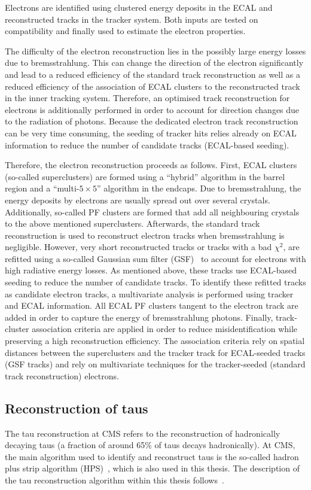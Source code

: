 Electrons are identified using clustered energy deposits in the ECAL and reconstructed tracks in the tracker system. 
Both inputs are tested on compatibility and finally used to estimate the electron properties. 

The difficulty of the electron reconstruction lies in the possibly large energy losses due to bremsstrahlung.
This can change the direction of the electron significantly and lead to a reduced efficiency of the standard track reconstruction as well as a reduced efficiency of the association of ECAL clusters to the reconstructed track in the inner tracking system.
Therefore, an optimised track reconstruction for electrons is additionally performed in order to account for direction changes due to the radiation of photons.
Because the dedicated electron track reconstruction can be very time consuming, the seeding of tracker hits relies already on ECAL information to reduce the number of candidate tracks (ECAL-based seeding).

Therefore, the electron reconstruction proceeds as follows.
First, ECAL clusters (so-called superclusters) are formed using a ``hybrid'' algorithm in the barrel region and a ``multi-$5\times 5$'' algorithm in the endcaps.
Due to bremsstrahlung, the energy deposits by electrons are usually spread out over several crystals.
Additionally, so-called PF clusters are formed that add all neighbouring crystals to the above mentioned superclusters. 
Afterwards, the standard track reconstruction is used to reconstruct electron tracks when bremsstrahlung is negligible.
However, very short reconstructed tracks or tracks with a bad $\chi^2$, are refitted using a so-called Gaussian sum filter (GSF)~\cite{bib:GSF_2003} to account for electrons with high radiative energy losses.
As mentioned above, these tracks use ECAL-based seeding to reduce the number of candidate tracks.  
To identify these refitted tracks as candidate electron tracks, a multivariate analysis is performed using tracker and ECAL information.
All ECAL PF clusters tangent to the electron track are added in order to capture the energy of bremsstrahlung photons.
Finally, track-cluster association criteria are applied in order to reduce misidentification while preserving a high reconstruction efficiency.
The association criteria rely on spatial distances between the superclusters and the tracker track for ECAL-seeded tracks (GSF tracks) and rely on multivariate techniques for the tracker-seeded (standard track reconstruction) electrons.

\subsection{Reconstruction of taus}
\label{subsec:TauReconstruction}
The tau reconstruction at CMS refers to the reconstruction of hadronically decaying taus (a fraction of around 65\% of taus decays hadronically).
At CMS, the main algorithm used to identify and reconstruct taus is the so-called hadron plus strip algorithm (HPS)~\cite{bib:CMS:TauReconstruction_8TeV,bib:CMS:TauReconstruction_7TeV}, which is also used in this thesis.
The description of the tau reconstruction algorithm within this thesis follows~\cite{bib:CMS:TauReconstruction_8TeV}.

